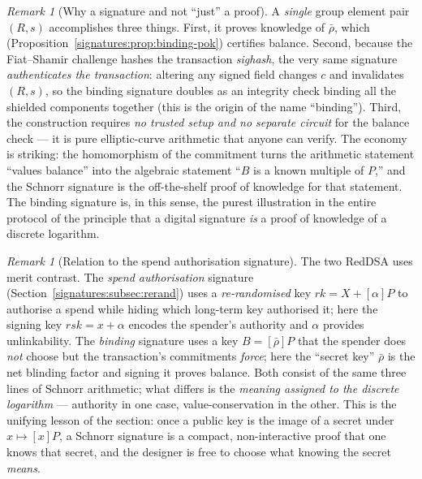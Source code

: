 \documentclass[11pt,a4paper]{article}
\theoremstyle{definition}
\theoremstyle{remark}
\newtheorem{remark}[theorem]{Remark}
\begin{document}
\begin{remark}[Why a signature and not ``just'' a proof]\label{signatures:rem:binding-why}
A \emph{single} group element pair \((R, s)\) accomplishes three things. First, it proves knowledge of \(\bar\rho\), which (Proposition~\ref{signatures:prop:binding-pok}) certifies balance. Second, because the Fiat--Shamir challenge hashes the transaction \emph{sighash}, the very same signature \emph{authenticates the transaction}: altering any signed field changes \(c\) and invalidates \((R,s)\), so the binding signature doubles as an integrity check binding all the shielded components together (this is the origin of the name ``binding''). Third, the construction requires \emph{no trusted setup and no separate circuit} for the balance check — it is pure elliptic-curve arithmetic that anyone can verify. The economy is striking: the homomorphism of the commitment turns the arithmetic statement ``values balance'' into the algebraic statement ``\(B\) is a known multiple of \(P\),'' and the Schnorr signature is the off-the-shelf proof of knowledge for that statement. The binding signature is, in this sense, the purest illustration in the entire protocol of the principle that a digital signature \emph{is} a proof of knowledge of a discrete logarithm.
\end{remark}

\begin{remark}[Relation to the spend authorisation signature]\label{signatures:rem:two-sigs}
The two RedDSA uses merit contrast. The \emph{spend authorisation} signature (Section~\ref{signatures:subsec:rerand}) uses a \emph{re-randomised} key \(\mathit{rk} = X + [\alpha]P\) to authorise a spend while hiding which long-term key authorised it; here the signing key \(\mathit{rsk} = x + \alpha\) encodes the spender's authority and \(\alpha\) provides unlinkability. The \emph{binding} signature uses a key \(B = [\bar\rho]P\) that the spender does \emph{not} choose but the transaction's commitments \emph{force}; here the ``secret key'' \(\bar\rho\) is the net blinding factor and signing it proves balance. Both consist of the same three lines of Schnorr arithmetic; what differs is the \emph{meaning assigned to the discrete logarithm} — authority in one case, value-conservation in the other. This is the unifying lesson of the section: once a public key is the image of a secret under \(x \mapsto [x]P\), a Schnorr signature is a compact, non-interactive proof that one knows that secret, and the designer is free to choose what knowing the secret \emph{means}.
\end{remark}
\end{document}
